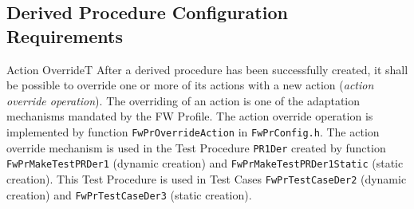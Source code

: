 \documentclass[requirements]{../fwprofile}
\begin{document}
\subsection{Derived Procedure Configuration Requirements}\label{req:configInterfaceDerivedPR}

\begin{fw_req}{Action Override}{T}
{After a derived procedure has been successfully created, it shall be possible to override one or more of its actions 
with a new action (\emph{action override operation}).}
{The overriding of an action is one of the adaptation mechanisms mandated by the FW Profile.}
{The action override operation is implemented by function \texttt{FwPrOverrideAction} in \texttt{FwPrConfig.h}.} 
{The action override mechanism is used in the Test Procedure \texttt{PR1Der} created by function 
\texttt{FwPrMakeTestPRDer1} (dynamic creation) and \texttt{FwPrMakeTestPRDer1Static} (static creation). This Test Procedure is used in 
Test Cases \texttt{FwPrTestCaseDer2} (dynamic creation) and \texttt{FwPrTestCaseDer3} (static creation).}
\end{fw_req}


\end{document}
